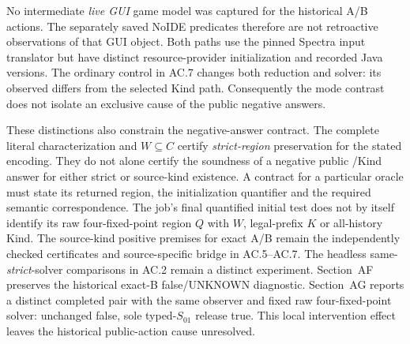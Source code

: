 No intermediate \emph{live GUI} game model was captured for the historical
A/B actions. The separately saved NoIDE predicates therefore are not
retroactive observations of that GUI object.
Both paths use the pinned Spectra input translator but have distinct
resource-provider initialization and recorded Java versions.
The ordinary control in AC.7 changes both reduction and solver:
its observed  differs from the selected Kind path.
Consequently the mode contrast does not isolate an exclusive cause of
the public negative answers.

These distinctions also constrain the negative-answer contract.
The complete literal characterization and $W\subseteq C$ certify
\emph{strict-region} preservation for the stated encoding.
They do not alone certify the soundness of a negative public
/Kind answer for either strict or source-kind
existence. A contract for a particular oracle must state its returned
region, the initialization quantifier and the required semantic
correspondence. The job's final quantified initial test does not by itself
identify its raw four-fixed-point region $Q$ with $W$, legal-prefix $K$
or all-history Kind.
The source-kind positive premises for exact A/B remain the independently
checked certificates and source-specific bridge in AC.5--AC.7.
The headless same-\emph{strict}-solver comparisons in AC.2 remain a distinct
experiment.
Section~AF preserves the historical exact-B false/UNKNOWN diagnostic.
Section~AG reports a distinct completed pair with the same observer and
fixed raw four-fixed-point solver: unchanged false, sole typed-$S_{01}$
release true. This local intervention effect leaves the historical
public-action cause unresolved.

